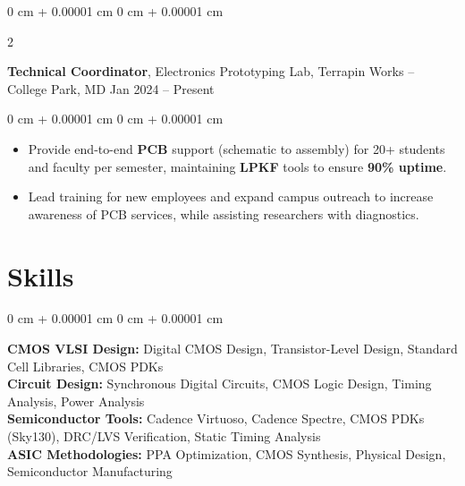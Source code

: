 \documentclass[10pt, letterpaper]{article}
\newenvironment{highlights}{
    \begin{itemize}[
        topsep=0.05 cm,
        parsep=0.05 cm,
        partopsep=0pt,
        itemsep=0pt,
        leftmargin=0 cm + 10pt
    ]
}{
    \end{itemize}
}
\newenvironment{onecolentry}{
    \begin{adjustwidth}{
        0 cm + 0.00001 cm
    }{
        0 cm + 0.00001 cm
    }
}{
    \end{adjustwidth}
}
\newenvironment{twocolentry}[2][]{
    \onecolentry
    \def\secondColumn{#2}
    \setcolumnwidth{\fill, 4.5 cm}
    \begin{paracol}{2}
}{
    \switchcolumn \raggedleft \secondColumn
    \end{paracol}
    \endonecolentry
}
\begin{document}
        \vspace{0.10 cm}
        \vspace{0.10 cm}

        \begin{twocolentry}{
            Jan 2024 – Present
        }
            \textbf{Technical Coordinator}, Electronics Prototyping Lab, Terrapin Works -- College Park, MD \end{twocolentry}
        \vspace{0.05 cm}
        \begin{onecolentry}
            \begin{highlights}
                \item Provide end-to-end \textbf{PCB} support (schematic to assembly) for 20+ students and faculty per semester, maintaining \textbf{LPKF} tools to ensure \textbf{90\% uptime}.
                \item Lead training for new employees and expand campus outreach to increase awareness of PCB services, while assisting researchers with diagnostics.
            \end{highlights}
        \end{onecolentry}
    \section{Skills}
        \begin{onecolentry}
            \textbf{CMOS VLSI Design:} Digital CMOS Design, Transistor-Level Design, Standard Cell Libraries, CMOS PDKs \\
            \textbf{Circuit Design:} Synchronous Digital Circuits, CMOS Logic Design, Timing Analysis, Power Analysis \\
            \textbf{Semiconductor Tools:} Cadence Virtuoso, Cadence Spectre, CMOS PDKs (Sky130), DRC/LVS Verification, Static Timing Analysis \\
            \textbf{ASIC Methodologies:} PPA Optimization, CMOS Synthesis, Physical Design, Semiconductor Manufacturing
        \end{onecolentry}
\end{document}

